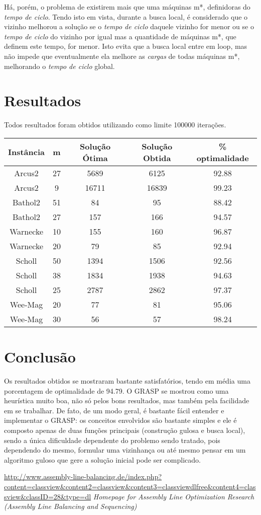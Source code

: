 \documentclass{report}
\begin{document}
Há, porém, o problema de existirem mais que uma máquinas m*, definidoras do \emph{tempo de ciclo}. Tendo isto em vista,
durante a busca local, é considerado que o vizinho melhorou a solução se o \emph{tempo de ciclo} daquele vizinho for
menor ou se o \emph{tempo de ciclo} do vizinho por igual mas a quantidade de máquinas m*, que definem este tempo, for
menor. Isto evita que a busca local entre em loop, mas não impede que eventualmente ela melhore as \emph{cargas} de
todas máquinas m*, melhorando o \emph{tempo de ciclo} global.

\chapter{Resultados}

Todos resultados foram obtidos utilizando como limite 100000 iterações.

\begin{table}[htbp]
 \begin{tabular}{|c|c|c|c|c|}
  \hline
  \textbf{Instância} & \textbf{m} & \textbf{Solução Ótima} & \textbf{Solução Obtida} & \% optimalidade \\
  \hline
  Arcus2 & 27 & 5689 & 6125 & 92.88 \\
  \hline
  Arcus2 & 9 & 16711 & 16839 & 99.23 \\
  \hline
  Bathol2 & 51 & 84 & 95 & 88.42 \\
  \hline
  Bathol2 & 27 & 157 & 166 & 94.57 \\
  \hline
  Warnecke & 10 & 155 & 160 & 96.87 \\
  \hline
  Warnecke & 20 & 79 & 85 & 92.94 \\
  \hline
  Scholl & 50 & 1394 & 1506 & 92.56 \\
  \hline
  Scholl & 38 & 1834 & 1938 & 94.63 \\
  \hline
  Scholl & 25 & 2787 & 2862 & 97.37 \\
  \hline
  Wee-Mag & 20 & 77 & 81 & 95.06 \\
  \hline
  Wee-Mag & 30 & 56 & 57 & 98.24 \\
  \hline
 \end{tabular}
\end{table}


\chapter{Conclusão}

Os resultados obtidos se mostraram bastante satisfatórios, tendo em média uma porcentagem de optimalidade de 94.79. O
GRASP se mostrou como uma heurística muito boa, não só pelos bons resultados, mas também pela facilidade em se
trabalhar. De fato, de um modo geral, é bastante fácil entender e implementar o GRASP: os conceitos envolvidos são
bastante simples e ele é composto apenas de duas funções principais (construção gulosa e busca local), sendo a única
dificuldade dependente do problemo sendo tratado, pois dependendo do mesmo, formular uma vizinhança ou até mesmo pensar
em um algoritmo guloso que gere a solução inicial pode ser complicado.



	\url{http://www.assembly-line-balancing.de/index.php?content=classview&content2=classview&content3=classviewdlfree&content4=classview&classID=28&type=dl}
	\emph{Homepage for Assembly Line Optimization Research (Assembly Line Balancing and Sequencing)}
\end{document}
